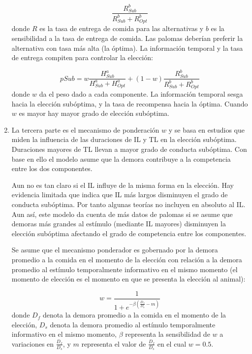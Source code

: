 \documentclass[a4paper,12pt]{article}
\begin{document}
\begin{enumerate}
		\begin{equation}
			\frac{
				R^{b}_{Sub}
			}{
				R^{b}_{Sub} + R^{b}_{Opt}
			}
		\end{equation}
		donde $R$ es la tasa de entrega de comida para las alternativas y $b$ es la sensibilidad a la tasa de entrega de comida. Las palomas deberían preferir la alternativa con tasa más alta (la óptima). La información temporal y la tasa de entrega compiten para controlar la elección:

		\begin{equation}
			pSub = 
			w \frac{
				H^{a}_{Sub}
			}{
				H^{a}_{Sub}+H^{a}_{Opt}
			} +
			(1-w)
			\frac{
				R^{b}_{Sub}
			}{
				R^{b}_{Sub} + R^{b}_{Opt}
			}
		\end{equation}
		donde $w$ da el peso dado a cada componente. La información temporal sesga hacia la elección subóptima, y la tasa de recompensa hacia la óptima. Cuando $w$ es mayor hay mayor grado de elección subóptima.
	\item La tercera parte es el mecanismo de ponderación $w$ y se basa en estudios que miden la influencia de las duraciones de IL y TL en la elección subóptima. Duraciones mayores de TL llevan a mayor grado de conducta subóptima. Con base en ello el modelo asume que la demora contribuye a la competencia entre los dos componentes.
		
		Aun no es tan claro si el IL influye de la misma forma en la elección. Hay evidencia limitada que indica que IL más largos disminuyen el grado de conducta subóptima. Por tanto algunas teorías no incluyen en absoluto al IL. Aun así, este modelo da cuenta de más datos de palomas si se asume que demoras más grandes al estímulo (mediante IL mayores) disminuyen la elección subóptima afectando el grado de competencia entre los componentes.

		Se asume que el mecanismo ponderador es gobernado por la demora promedio a la comida en el momento de la elección con relación a la demora promedio al estímulo temporalmente informativo en el mismo momento (el momento de elección es el momento en que se presenta la elección al animal):

		\begin{equation}
			w = 
			\frac{
				1
			}{
			1 + e^{-\beta \left(\frac{
				D_{f}
			}{
				D_{s}
			} - m \right)}
			}
		\end{equation}
		donde $D_{f}$ denota la demora promedio a la comida en el momento de la elección, $D_{s}$ denota la demora promedio al estímulo temporalmente informativo en el mismo momento, $\beta$ representa la sensibilidad de $w$ a variaciones en $\frac{D_{f}}{D_{s}}$, y $m$ representa el valor de $\frac{D_{f}}{D_{s}}$ en el cual $w = 0{.}5$.
		

\end{enumerate}
\end{document}
